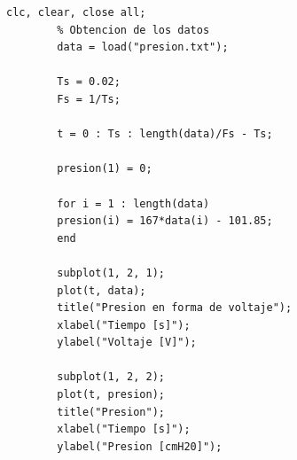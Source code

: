 \documentclass[conference]{IEEEtran}
\begin{document}
	\begin{lstlisting}[numbers=none, caption="Análisis presión - Voljate", label=lst:presion]
		clc, clear, close all;
		% Obtencion de los datos
		data = load("presion.txt");
		
		Ts = 0.02;
		Fs = 1/Ts;
		
		t = 0 : Ts : length(data)/Fs - Ts;
		
		presion(1) = 0;
		
		for i = 1 : length(data)
		presion(i) = 167*data(i) - 101.85;
		end
		
		subplot(1, 2, 1);
		plot(t, data);
		title("Presion en forma de voltaje");
		xlabel("Tiempo [s]");
		ylabel("Voltaje [V]");
		
		subplot(1, 2, 2);
		plot(t, presion);
		title("Presion");
		xlabel("Tiempo [s]");
		ylabel("Presion [cmH20]");
	\end{lstlisting}
	
	
	
\end{document}
